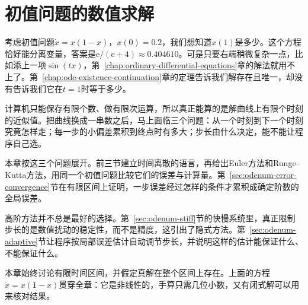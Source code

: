 \chapter{初值问题的数值求解}
\label{chap:ode-numerical-methods}

考虑初值问题$\dot{x}=x(1-x)$，$x(0)=0.2$，我们想知道$x(1)$是多少。这个方程恰好能分离变量，答案是$\mathrm{e}/(\mathrm{e}+4)\approx0.404610$。可是只要右端稍微复杂一点，比如添上一项$\sin(tx)$，第~\ref{chap:ordinary-differential-equations}章的解法就用不上了。第~\ref{chap:ode-existence-continuation}章的定理告诉我们解存在且唯一，却没有告诉我们它在$t=1$时等于多少。

计算机只能保存有限个数、做有限次运算，所以真正能算的是解曲线上有限个时刻的近似值。把曲线换成一串数之后，马上面临三个问题：从一个时刻到下一个时刻究竟怎样走；每一步的小偏差累积到终点时有多大；步长由什么决定，能不能让程序自己选。

本章按这三个问题展开。前三节建立时间离散的语言，再给出Euler方法和Runge--Kutta方法，用同一个初值问题比较它们的误差与计算量。第~\ref{sec:odenum-error-convergence}节在有限区间上证明，一步误差经过怎样的条件才累积成确定阶数的全局误差。

高阶方法并不总是最好的选择。第~\ref{sec:odenum-stiff}节的快慢系统里，真正限制步长的是数值扰动的稳定性，而不是精度，这引出了隐式方法。第~\ref{sec:odenum-adaptive}节让程序按局部误差估计自动调节步长，并说明这样的估计能保证什么、不能保证什么。

本章始终讨论有限时间区间，并假定真解在整个区间上存在。上面的方程$\dot{x}=x(1-x)$贯穿全章：它是非线性的，手算只需几位小数，又有闭式解可以用来核对结果。









